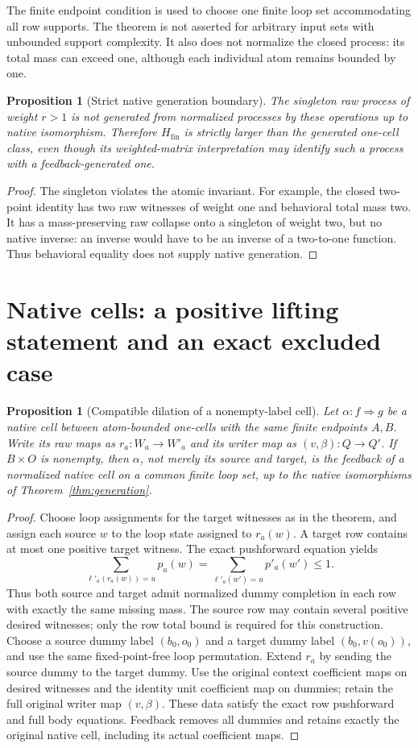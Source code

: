 \documentclass[11pt]{article}
\newtheorem{proposition}[theorem]{Proposition}
\newcommand{\HM}{H_{\mathrm{fin}}}
\begin{document}
The finite endpoint condition is used to choose one finite loop set accommodating all row supports. The theorem is not asserted for arbitrary input sets with unbounded support complexity. It also does not normalize the closed process: its total mass can exceed one, although each individual atom remains bounded by one.

\begin{proposition}[Strict native generation boundary]
The singleton raw process of weight $r>1$ is not generated from normalized processes by these operations up to native isomorphism. Therefore $\HM$ is strictly larger than the generated one-cell class, even though its weighted-matrix interpretation may identify such a process with a feedback-generated one.
\end{proposition}
\begin{proof}
The singleton violates the atomic invariant. For example, the closed two-point identity has two raw witnesses of weight one and behavioral total mass two. It has a mass-preserving raw collapse onto a singleton of weight two, but no native inverse: an inverse would have to be an inverse of a two-to-one function. Thus behavioral equality does not supply native generation.
\end{proof}

\section{Native cells: a positive lifting statement and an exact excluded case}
\begin{proposition}[Compatible dilation of a nonempty-label cell]
Let $\alpha:f\Rightarrow g$ be a native cell between atom-bounded one-cells with the same finite endpoints $A,B$. Write its raw maps as $r_a:W_a\to W'_a$ and its writer map as $(v,\beta):Q\to Q'$. If $B\times O$ is nonempty, then $\alpha$, not merely its source and target, is the feedback of a normalized native cell on a common finite loop set, up to the native isomorphisms of Theorem~\ref{thm:generation}.
\end{proposition}
\begin{proof}
Choose loop assignments for the target witnesses as in the theorem, and assign each source $w$ to the loop state assigned to $r_a(w)$. A target row contains at most one positive target witness. The exact pushforward equation yields
\[
 \sum_{\ell'_a(r_a(w))=u}p_a(w)
 =\sum_{\ell'_a(w')=u}p'_a(w')\leq1.
\]
Thus both source and target admit normalized dummy completion in each row with exactly the same missing mass. The source row may contain several positive desired witnesses; only the row total bound is required for this construction. Choose a source dummy label $(b_0,o_0)$ and a target dummy label $(b_0,v(o_0))$, and use the same fixed-point-free loop permutation. Extend $r_a$ by sending the source dummy to the target dummy. Use the original context coefficient maps on desired witnesses and the identity unit coefficient map on dummies; retain the full original writer map $(v,\beta)$. These data satisfy the exact row pushforward and full body equations. Feedback removes all dummies and retains exactly the original native cell, including its actual coefficient maps.
\end{proof}
\end{document}
